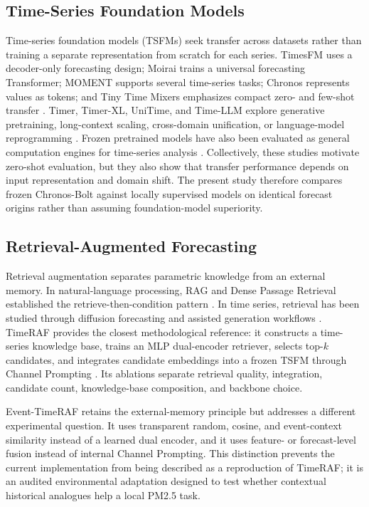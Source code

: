 \subsection{Time-Series Foundation Models}
Time-series foundation models (TSFMs) seek transfer across datasets rather than
training a separate representation from scratch for each series. TimesFM uses a
decoder-only forecasting design; Moirai trains a universal forecasting
Transformer; MOMENT supports several time-series tasks; Chronos represents
values as tokens; and Tiny Time Mixers emphasizes compact zero- and few-shot
transfer
\cite{das2024timesfm,woo2024moirai,goswami2024moment,ansari2024chronos,ekambaram2024ttm}.
Timer, Timer-XL, UniTime, and Time-LLM explore generative pretraining,
long-context scaling, cross-domain unification, or language-model reprogramming
\cite{liu2024timer,liu2025timerxl,liu2024unitime,jin2024timellm}. Frozen
pretrained models have also been evaluated as general computation engines for
time-series analysis \cite{zhou2023onefitsall}. Collectively, these studies
motivate zero-shot evaluation, but they also show that transfer performance
depends on input representation and domain shift. The present study therefore
compares frozen Chronos-Bolt against locally supervised models on identical
forecast origins rather than assuming foundation-model superiority.

\subsection{Retrieval-Augmented Forecasting}
Retrieval augmentation separates parametric knowledge from an external memory.
In natural-language processing, RAG and Dense Passage Retrieval established the
retrieve-then-condition pattern \cite{lewis2020rag,karpukhin2020dpr}. In time
series, retrieval has been studied through diffusion forecasting and assisted
generation workflows \cite{liu2024ratd,ang2024tsgassist}. TimeRAF provides the
closest methodological reference: it constructs a time-series knowledge base,
trains an MLP dual-encoder retriever, selects top-$k$ candidates, and integrates
candidate embeddings into a frozen TSFM through Channel Prompting
\cite{zhang2025timeraf}. Its ablations separate retrieval quality, integration,
candidate count, knowledge-base composition, and backbone choice.

Event-TimeRAF retains the external-memory principle but addresses a different
experimental question. It uses transparent random, cosine, and event-context
similarity instead of a learned dual encoder, and it uses feature- or
forecast-level fusion instead of internal Channel Prompting. This distinction
prevents the current implementation from being described as a reproduction of
TimeRAF; it is an audited environmental adaptation designed to test whether
contextual historical analogues help a local PM2.5 task.

